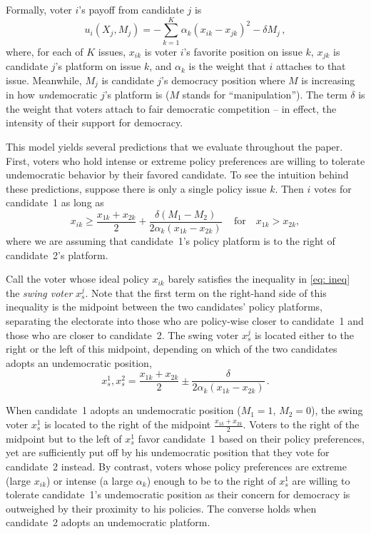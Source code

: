 \documentclass[letterpaper, 12pt]{article}
\begin{document}
\begin{raggedright}
Formally, voter $i$'s payoff from candidate $j$ is
\begin{equation}
\label{eq: utility}
u_i(X_j, M_j) = -\sum\limits_{k=1}^K \alpha_k (x_{ik} - x_{jk})^2 - \delta M_j \, ,
\end{equation}
where, for each of $K$ issues, $x_{ik}$ is voter $i$'s favorite position on issue $k$, $x_{jk}$ is candidate $j$'s platform on issue $k$, and $\alpha_k$ is the weight that $i$ attaches to that issue. Meanwhile, $M_j$ is candidate $j$'s democracy position where $M$ is increasing in how \emph{un}democratic $j$'s platform is ($M$ stands for ``manipulation''). The term $\delta$ is the weight that voters attach to fair democratic competition -- in effect, the intensity of their support for democracy.

This model yields several predictions that we evaluate throughout the paper. First, voters who hold intense or extreme policy preferences are willing to tolerate undemocratic behavior by their favored candidate. To see the intuition behind these predictions, suppose there is only a single policy issue $k$. Then $i$ votes for candidate~1 as long as
\begin{equation}
\label{eq: ineq}
x_{ik} \ge \frac{x_{1k} + x_{2k}}{2} + \frac{\delta(M_1- M_2)}{2 \alpha_k (x_{1k} - x_{2k})} \, \quad \text{for} \quad x_{1k} > x_{2k},
\end{equation}
where we are assuming that candidate~1's policy platform is to the right of candidate~2's platform.

Call the voter whose ideal policy $x_{ik}$ barely satisfies the inequality in \eqref{eq: ineq} the \emph{swing voter} $x_{s}^{j}$. Note that the first term on the right-hand side of this inequality is the midpoint between the two candidates' policy platforms, separating the electorate into those who are policy-wise closer to candidate~1 and those who are closer to candidate~2. The swing voter $x_{s}^{j}$ is located either to the right or the left of this midpoint, depending on which of the two candidates adopts an undemocratic position,
\begin{equation}
\label{eq: demfirst}
x_{s}^1, x_{s}^2 = \frac{x_{1k} + x_{2k}}{2} \pm \frac{\delta}{2 \alpha_k (x_{1k} - x_{2k})} \, .
\end{equation}

When candidate~1 adopts an undemocratic position ($M_1=1$, $M_2=0$), the swing voter $x_{s}^{1}$ is located to the right of the midpoint $\frac{x_{1k} + x_{2k}}{2}$. Voters to the right of the midpoint but to the left of $x_{s}^1$ favor candidate~1 based on their policy preferences, yet are sufficiently put off by his undemocratic position that they vote for candidate~2 instead. By contrast, voters whose policy preferences are extreme (large $x_{ik}$) or intense (a large $\alpha_k$) enough to be to the right of $x_{s}^1$ are willing to tolerate candidate~1's undemocratic position as their concern for democracy is outweighed by their proximity to his policies. The converse holds when candidate~2 adopts an undemocratic platform.


\end{raggedright}
\end{document}
